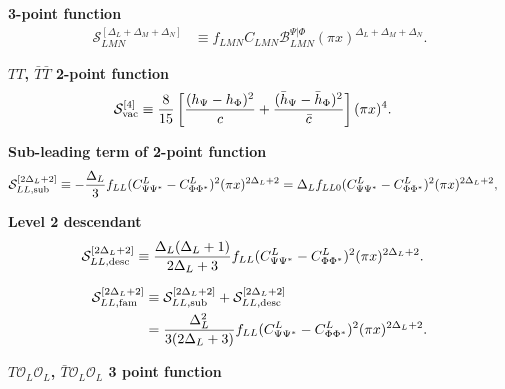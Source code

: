 \documentclass[11pt]{article}
\newcommand{\mO}{\mathcal{O}}
\newcommand{\nn}{\nonumber}
\begin{document}
\textbf{3-point function}
\begin{align}
    \mathcal S_{LMN}^{[\Delta_L+\Delta_M+\Delta_N]}
    &\equiv
    f_{LMN}C_{LMN}
    \mathcal B_{LMN}^{\Psi|\Phi}
    (\pi x)^{\Delta_L+\Delta_M+\Delta_N}.
\end{align}

\textbf{$TT$, $\bar T\bar T$ 2-point function}
\begin{align}
    \mathcal S_{\rm vac}^{[4]}
    &\equiv
    \frac{8}{15}
    \left[
    \frac{(h_\Psi-h_\Phi)^2}{c}
    +
    \frac{(\bar h_\Psi-\bar h_\Phi)^2}{\bar c}
    \right]
    (\pi x)^4 .
\end{align}

\textbf{Sub-leading term of 2-point function}
\begin{align}
    \mathcal S_{LL,{\rm sub}}^{[2\Delta_L+2]}
    &\equiv
    -\frac{\Delta_L}{3}
    f_{LL}(C^L_{\Psi\Psi^*}-C^L_{\Phi\Phi^*})^2
    (\pi x)^{2\Delta_L+2} = \Delta_L f_{LL0}(C^L_{\Psi\Psi^*}-C^L_{\Phi\Phi^*})^2
    (\pi x)^{2\Delta_L+2},
\end{align}

\textbf{Level 2 descendant}
\begin{align}
    \mathcal S_{LL,{\rm desc}}^{[2\Delta_L+2]}
    &\equiv
    \frac{\Delta_L(\Delta_L+1)}
    {2\Delta_L+3}
    f_{LL}(C^L_{\Psi\Psi^*}-C^L_{\Phi\Phi^*})^2
    (\pi x)^{2\Delta_L+2}.
\end{align}

\begin{align}
    \mathcal S_{LL,{\rm fam}}^{[2\Delta_L+2]}
    &\equiv
    \mathcal S_{LL,{\rm sub}}^{[2\Delta_L+2]}
    +
    \mathcal S_{LL,{\rm desc}}^{[2\Delta_L+2]}
    \nn\\
    &=
    \frac{\Delta_L^2}
    {3(2\Delta_L+3)}
    f_{LL}(C^L_{\Psi\Psi^*}-C^L_{\Phi\Phi^*})^2
    (\pi x)^{2\Delta_L+2}.
\end{align}

\textbf{$T\mO_L\mO_L$, $\bar T\mO_L\mO_L$ 3 point function}
\end{document}

